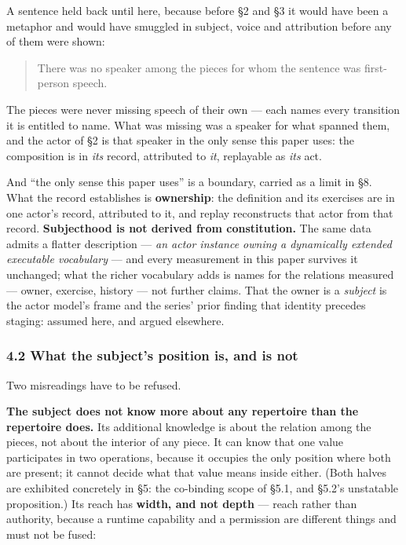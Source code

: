 \documentclass[
]{article}
\begin{document}
A sentence held back until here, because before §2 and §3 it would have
been a metaphor and would have smuggled in subject, voice and
attribution before any of them were shown:

\begin{quote}
There was no speaker among the pieces for whom the sentence was
first-person speech.
\end{quote}

The pieces were never missing speech of their own --- each names every
transition it is entitled to name. What was missing was a speaker for
what spanned them, and the actor of §2 is that speaker in the only sense
this paper uses: the composition is in \emph{its} record, attributed to
\emph{it}, replayable as \emph{its} act.

And ``the only sense this paper uses'' is a boundary, carried as a limit
in §8. What the record establishes is \textbf{ownership}: the definition
and its exercises are in one actor's record, attributed to it, and
replay reconstructs that actor from that record. \textbf{Subjecthood is
not derived from constitution.} The same data admits a flatter
description --- \emph{an actor instance owning a dynamically extended
executable vocabulary} --- and every measurement in this paper survives
it unchanged; what the richer vocabulary adds is names for the relations
measured --- owner, exercise, history --- not further claims. That the
owner is a \emph{subject} is the actor model's frame and the series'
prior finding that identity precedes staging: assumed here, and argued
elsewhere.

\subsubsection{4.2 What the subject's position is, and is
not}\label{what-the-subjects-position-is-and-is-not}

Two misreadings have to be refused.

\textbf{The subject does not know more about any repertoire than the
repertoire does.} Its additional knowledge is about the relation among
the pieces, not about the interior of any piece. It can know that one
value participates in two operations, because it occupies the only
position where both are present; it cannot decide what that value means
inside either. (Both halves are exhibited concretely in §5: the
co-binding scope of §5.1, and §5.2's unstatable proposition.) Its reach
has \textbf{width, and not depth} --- reach rather than authority,
because a runtime capability and a permission are different things and
must not be fused:
\end{document}
